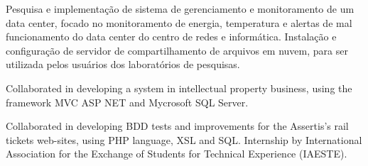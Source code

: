 \documentclass[9pt,a4paper]{altacv}
\begin{document}

\begin{fullwidth}
\makecvheader
\end{fullwidth}



Pesquisa e implementação de sistema de gerenciamento e monitoramento de um data center, focado no monitoramento de energia, temperatura e alertas de mal funcionamento do data center do centro de redes e informática. Instalação e configuração de servidor de compartilhamento de arquivos em nuvem, para ser utilizada pelos usuários dos laboratórios de pesquisas.

\divider


Collaborated in developing a system in intellectual property business, using the framework MVC ASP NET and Mycrosoft SQL Server. 

\divider


Collaborated in developing BDD tests and improvements for the Assertis’s rail tickets web-sites, using PHP language, XSL and SQL. Internship by International Association for the Exchange of Students for Technical Experience (IAESTE).
\end{document}
